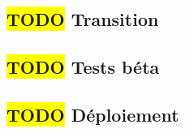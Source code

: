 \textcolor[RGB]{46, 116, 181}{\chapter{\colorbox{yellow}{TODO} Transition}}
\section{\colorbox{yellow}{TODO} Tests béta}

\section{\colorbox{yellow}{TODO} Déploiement}
